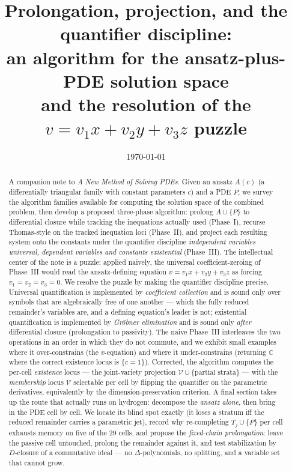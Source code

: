 \documentclass[11pt]{article}
\title{Prolongation, projection, and the quantifier discipline:\\
       an algorithm for the ansatz-plus-PDE solution space\\
       and the resolution of the $v = v_1x+v_2y+v_3z$ puzzle}
\author{}
\date{\today}
\newcommand{\Var}{\mathcal{V}}
\begin{document}
\maketitle

\begin{abstract}
\noindent
A companion note to \emph{A New Method of Solving PDEs}. Given an ansatz $A(c)$
(a differentially triangular family with constant parameters $c$) and a PDE
$P$, we survey the algorithm families available for computing the solution
space of the combined problem, then develop a proposed three-phase algorithm:
prolong $A \cup \{P\}$ to differential closure while tracking the inequations
actually used (Phase~I), recurse Thomas-style on the tracked inequation loci
(Phase~II), and project each resulting system onto the constants under the
quantifier discipline \emph{independent variables universal, dependent
variables and constants existential} (Phase~III). The intellectual center of
the note is a puzzle: applied naively, the universal coefficient-zeroing of
Phase~III would read the ansatz-defining equation $v = v_1x+v_2y+v_3z$ as
forcing $v_1=v_2=v_3=0$. We resolve the puzzle by making the quantifier
discipline precise. Universal quantification is implemented by
\emph{coefficient collection} and is sound only over symbols that are
algebraically free of one another --- which the fully reduced remainder's
variables are, and a defining equation's leader is not; existential
quantification is implemented by \emph{Gr\"obner elimination} and is sound only
\emph{after} differential closure (prolongation to passivity). The naive
Phase~III interleaves the two operations in an order in which they do not
commute, and we exhibit small examples where it over-constrains (the
$v$-equation) and where it under-constrains (returning $\mathbb{C}$ where the
correct existence locus is $\{c=1\}$). Corrected, the algorithm computes the
per-cell \emph{existence} locus --- the joint-variety projection
$\Var \cup \{\text{partial strata}\}$ --- with the \emph{membership} locus
$\Var$ selectable per cell by flipping the quantifier on the parametric
derivatives, equivalently by the dimension-preservation criterion.
A final section takes up the route that actually runs on hydrogen: decompose
the \emph{ansatz alone}, then bring in the PDE cell by cell. We locate its
blind spot exactly (it loses a stratum iff the reduced remainder carries a
parametric jet), record why re-completing $T_j\cup\{P\}$ per cell exhausts
memory on five of the 29 cells, and propose the \emph{fixed-chain
prolongation}: leave the passive cell untouched, prolong the remainder
against it, and test stabilization by $D$-closure of a commutative ideal ---
no $\Delta$-polynomials, no splitting, and a variable set that cannot grow.
\end{abstract}
\end{document}
